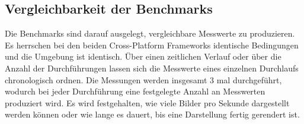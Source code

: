 \subsection{Vergleichbarkeit der Benchmarks}

Die Benchmarks sind darauf ausgelegt, vergleichbare Messwerte zu produzieren. Es herrschen bei den beiden Cross-Platform Frameworks identische Bedingungen und die Umgebung ist identisch. Über einen zeitlichen Verlauf oder über die Anzahl der Durchführungen lassen sich die Messwerte eines einzelnen Durchlaufs chronologisch ordnen. Die Messungen werden insgesamt 3 mal durchgeführt, wodurch bei jeder Durchführung eine festgelegte Anzahl an Messwerten produziert wird. Es wird festgehalten, wie viele Bilder pro Sekunde dargestellt werden können oder wie lange es dauert, bis eine Darstellung fertig gerendert ist. 

